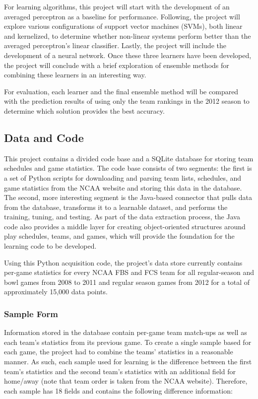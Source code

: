 \documentclass[10pt,letterpaper]{article}
\begin{document}
For learning algorithms, this project will start with the development of an averaged perceptron as a baseline for performance.
Following, the project will explore various configurations of support vector machines (SVMs), both linear and kernelized, to determine whether non-linear systems perform better than the averaged perceptron's linear classifier.
Lastly, the project will include the development of a neural network.
Once these three learners have been developed, the project will conclude with a brief exploration of ensemble methods for combining these learners in an interesting way.

For evaluation, each learner and the final ensemble method will be compared with the prediction results of using only the team rankings in the 2012 season to determine which solution provides the best accuracy.

\subsection{Data and Code}

This project contains a divided code base and a SQLite database for storing team schedules and game statistics.
The code base consists of two segments: the first is a set of Python scripts for downloading and parsing team lists, schedules, and game statistics from the NCAA website and storing this data in the database.
The second, more interesting segment is the Java-based connector that pulls data from the database, transforms it to a learnable dataset, and performs the training, tuning, and testing.
As part of the data extraction process, the Java code also provides a middle layer for creating object-oriented structures around play schedules, teams, and games, which will provide the foundation for the learning code to be developed.

Using this Python acquisition code, the project's data store currently contains per-game statistics for every NCAA FBS and FCS team for all regular-season and bowl games from 2008 to 2011 and regular season games from 2012 for a total of approximately 15,000 data points.

\subsubsection{Sample Form}

Information stored in the database contain per-game team match-ups as well as each team's statistics from its previous game.
To create a single sample based for each game, the project had to combine the teams' statistics in a reasonable manner.
As such, each sample used for learning is the difference between the first team's statistics and the second team's statistics with an additional field for home/away (note that team order is taken from the NCAA website).
Therefore, each sample has 18 fields and contains the following difference information:
\end{document}

